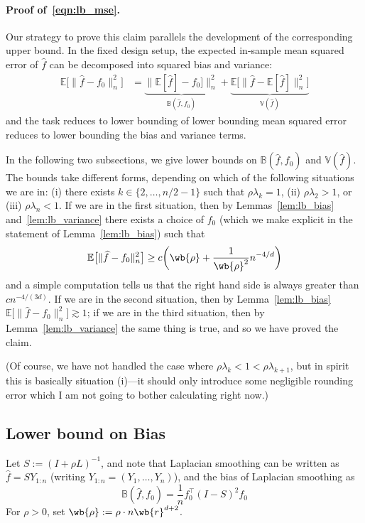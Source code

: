 \documentclass{article}
\newcommand{\1}{\mathbf{1}}
\newcommand{\Lap}{L}
\newcommand{\Ebb}{\mathbb{E}}
\newcommand{\wh}[1]{\widehat{#1}}
\theoremstyle{definition}
\theoremstyle{remark}
\begin{document}
\paragraph{Proof of~\eqref{eqn:lb_mse}.}
Our strategy to prove this claim parallels the development of the corresponding upper bound. In the fixed design setup, the expected in-sample mean squared error of $\wh{f}$ can be decomposed into squared bias and variance:
\begin{align*}
\Ebb\bigl[\|\wh{f} - f_0\|_n^2\bigr] & = \underbrace{\|\Ebb[\wh{f}] - f_0]\|_n^2}_{\mathbb{B}(\wh{f},f_0)} + \underbrace{\Ebb\bigl[\|\wh{f} - \Ebb[\wh{f}]\|_n^2\bigr]}_{\mathbb{V}(\wh{f})}
\end{align*}
and the task reduces to lower bounding of lower bounding mean squared error reduces to lower bounding the bias and variance terms.

In the following two subsections, we give lower bounds on $\mathbb{B}(\wh{f},f_0)$ and $\mathbb{V}(\wh{f})$. The bounds take different forms, depending on which of the following situations we are in: (i) there exists $k \in \{2,\ldots,n/2 - 1\}$ such that $\rho \lambda_k = 1$, (ii) $\rho \lambda_2 > 1$, or (iii) $\rho \lambda_n < 1$. If we are in the first situation, then by Lemmas~\ref{lem:lb_bias} and~\ref{lem:lb_variance} there exists a choice of $f_0$ (which we make explicit in the statement of Lemma~\ref{lem:lb_bias}) such that
\begin{equation*}
\Ebb\bigl[\|\wh{f} - f_0\|_n^2\bigr] \geq c\biggl(\wb{\rho} + \frac{1}{\wb{\rho}^2}n^{-4/d}\biggr)
\end{equation*}
and a simple computation tells us that the right hand side is always greater than $cn^{-4/(3d)}$. 
If we are in the second situation, then by Lemma~\ref{lem:lb_bias} $\Ebb\bigl[\|\wh{f} - f_0\|_n^2\bigr] \gtrsim 1$; if we are in the third situation, then by Lemma~\ref{lem:lb_variance} the same thing is true, and so we have proved the claim.

(Of course, we have not handled the case where $\rho\lambda_k < 1 < \rho\lambda_{k + 1}$, but in spirit this is basically situation (i)---it should only introduce some negligible rounding error which I am not going to bother calculating right now.)

\subsection{Lower bound on Bias}
Let $S := (I + \rho \Lap)^{-1}$, and note that Laplacian smoothing can be written as $\wh{f} = S Y_{1:n}$ (writing $Y_{1:n} = (Y_1,\ldots,Y_n)$), and the bias of Laplacian smoothing as
\begin{equation}
\label{eqn:bias}
\mathbb{B}(\wh{f},f_0) = \frac{1}{n}f_0^{\top}(I - S)^2 f_0
\end{equation}
For $\rho > 0$, set $\wb{\rho} := \rho \cdot n\wb{r}^{d + 2}$. 
\end{document}
